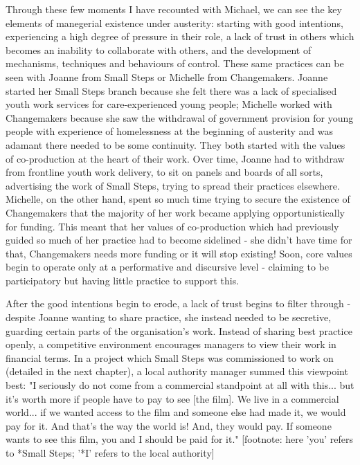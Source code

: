Through these few moments I have recounted with Michael, we can see the key elements of manegerial existence under austerity: starting with good intentions, experiencing a high degree of pressure in their role, a lack of trust in others which becomes an inability to collaborate with others, and the development of mechanisms, techniques and behaviours of control. These same practices can be seen with Joanne from Small Steps or Michelle from Changemakers. Joanne started her Small Steps branch because she felt there was a lack of specialised youth work services for care-experienced young people; Michelle worked with Changemakers because she saw the withdrawal of government provision for young people with experience of homelessness at the beginning of austerity and was adamant there needed to be some continuity. They both started with the values of co-production at the heart of their work. Over time, Joanne had to withdraw from frontline youth work delivery, to sit on panels and boards of all sorts, advertising the work of Small Steps, trying to spread their practices elsewhere. Michelle, on the other hand, spent so much time trying to secure the existence of Changemakers that the majority of her work became applying opportunistically for funding. This meant that her values of co-production which had previously guided so much of her practice had to become sidelined - she didn't have time for that, Changemakers needs more funding or it will stop existing! Soon, core values begin to operate only at a performative and discursive level - claiming to be participatory but having little practice to support this.

After the good intentions begin to erode, a lack of trust begins to filter through - despite Joanne wanting to share practice, she instead needed to be secretive, guarding certain parts of the organisation's work. Instead of sharing best practice openly, a competitive environment encourages managers to view their work in financial terms. In a project which Small Steps was commissioned to work on (detailed in the next chapter), a local authority manager summed this viewpoint best:
"I seriously do not come from a commercial standpoint at all with this... but it's worth more if people have to pay to see [the film]. We live in a commercial world... if we wanted access to the film and someone else had made it, we would pay for it. And that's the way the world is! And, they would pay. If someone wants to see this film, you and I should be paid for it." [footnote: here 'you' refers to *Small Steps; '*I' refers to the local authority]

